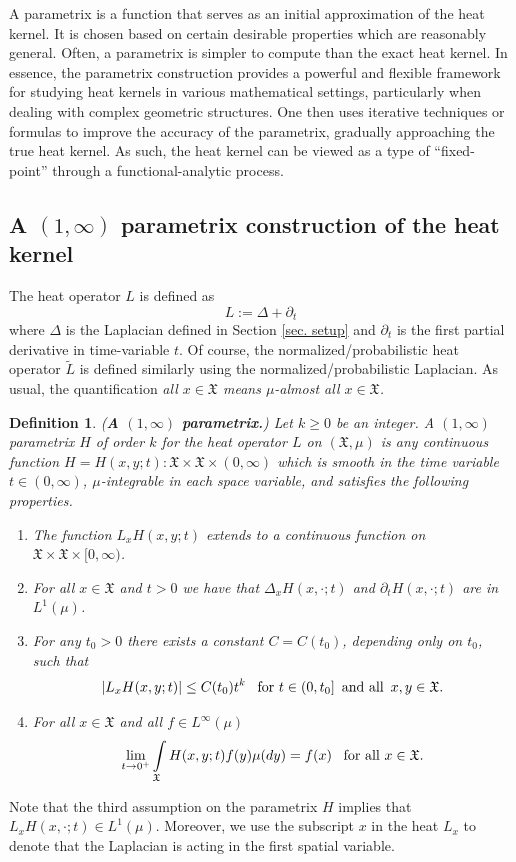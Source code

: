 \documentclass[11pt,reqno]{amsart}
\newtheorem{definition}[theorem]{Definition}
\theoremstyle{remark}
\theoremstyle{definition}
\numberwithin{theorem}{section} \numberwithin{equation}{section}
\newcommand{\X}{\mathfrak{X}}
\begin{document}
A parametrix is a function that serves as an initial approximation of the heat kernel. It is chosen based on certain desirable properties
which are reasonably general. Often,
a parametrix is simpler to compute than the exact heat kernel. In essence, the parametrix construction provides a powerful and flexible framework
for studying heat kernels in various mathematical settings, particularly when dealing with complex geometric structures.
One then uses iterative techniques or formulas to improve the accuracy of the parametrix, gradually approaching the true heat kernel.
As such, the heat kernel can be viewed as a type of ``fixed-point'' through a functional-analytic process.

\medskip
\subsection{A $(1,\infty)$ parametrix construction of the heat kernel}

The heat operator $L$ is defined as
$$
L:= \Delta+\partial_t
$$
where $\Delta$ is the Laplacian defined in Section \ref{sec. setup} and $\partial_t$ is the first partial derivative in time-variable $t$.
Of course, the normalized/probabilistic heat operator $\tilde L$ is defined similarly using
 the normalized/probabilistic Laplacian.  As usual, the quantification \it all $x \in \X$ \rm means \it $\mu$-almost all $x \in \X$. \rm

\begin{definition}\label{def. parametrix1} (\textbf{A $(1,\infty)$ parametrix.})
Let $k\geq 0$ be an integer. A \emph{$(1,\infty)$ parametrix} $H$ of order $k$  for the heat operator $L$ on $(\X,\mu)$ is any continuous function $H=H(x,y;t):\X\times \X\times (0,\infty)$
which is smooth in the time variable $t\in(0,\infty)$, $\mu$-integrable in each space variable, and satisfies the following properties.
\begin{enumerate}
\item The function $L_{x}H(x,y;t)$ extends to a continuous function on  $\X\times \X\times [0,\infty)$.

 \item  For all  $x\in \X$ and $t>0$ we have that $\Delta_{x}H(x,\cdot;t)$ and $\partial_t  H(x,\cdot;t)$ are in $L^1(\mu)$.
\item For any $t_0>0$ there exists a constant $C=C(t_0)$, depending only on
$t_0$, such that
$$
|L_{x}H(x,y;t)| \leq C(t_0)t^k
\,\,\,\,\,
\text{\rm for $t \in (0, t_0]$}
\,\,\,
\text{\rm and all}
\,\,\,
\text{\rm $x,y\in \X$.}
$$
\item For all $x\in \X$ and all $f\in L^\infty(\mu)$
\begin{equation}\label{eq:dirac property of heat kernel}
\lim\limits_{t \rightarrow 0^+}
\int\limits_{\X}H(x,y;t)f(y)\mu(dy)=f(x)
\,\,\,\,\,\text{\rm for all $x\in\X$.}
\end{equation}
\end{enumerate}
\end{definition}
Note that the third assumption on the parametrix $H$ implies that $L_{x}H(x,\cdot;t)\in L^1(\mu)$. Moreover, we use the subscript $x$ in the heat $L_x$ to denote that the Laplacian is acting in the first spatial variable.
\end{document}
